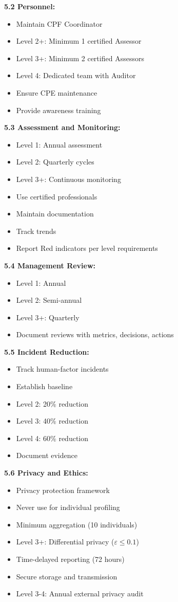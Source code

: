 \documentclass[11pt,a4paper]{article}
\begin{document}
\textbf{5.2 Personnel:}
\begin{itemize}
\item Maintain CPF Coordinator
\item Level 2+: Minimum 1 certified Assessor
\item Level 3+: Minimum 2 certified Assessors
\item Level 4: Dedicated team with Auditor
\item Ensure CPE maintenance
\item Provide awareness training
\end{itemize}

\textbf{5.3 Assessment and Monitoring:}
\begin{itemize}
\item Level 1: Annual assessment
\item Level 2: Quarterly cycles
\item Level 3+: Continuous monitoring
\item Use certified professionals
\item Maintain documentation
\item Track trends
\item Report Red indicators per level requirements
\end{itemize}

\textbf{5.4 Management Review:}
\begin{itemize}
\item Level 1: Annual
\item Level 2: Semi-annual
\item Level 3+: Quarterly
\item Document reviews with metrics, decisions, actions
\end{itemize}

\textbf{5.5 Incident Reduction:}
\begin{itemize}
\item Track human-factor incidents
\item Establish baseline
\item Level 2: 20\% reduction
\item Level 3: 40\% reduction
\item Level 4: 60\% reduction
\item Document evidence
\end{itemize}

\textbf{5.6 Privacy and Ethics:}
\begin{itemize}
\item Privacy protection framework
\item Never use for individual profiling
\item Minimum aggregation (10 individuals)
\item Level 3+: Differential privacy ($\varepsilon \leq 0.1$)
\item Time-delayed reporting (72 hours)
\item Secure storage and transmission
\item Level 3-4: Annual external privacy audit
\end{itemize}
\end{document}
